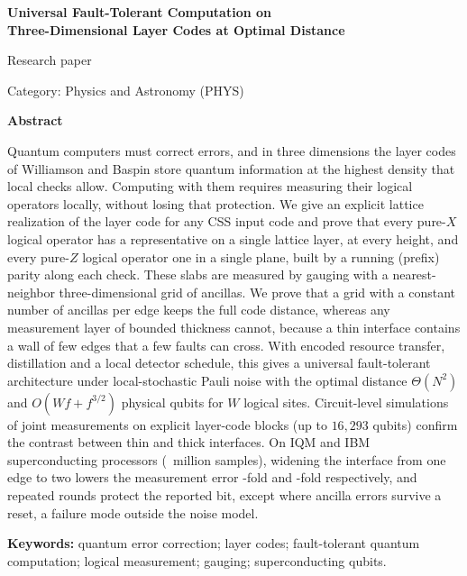 \documentclass[10pt,a4paper,twocolumn]{article}
\begin{document}
\begin{titlepage}
\centering
\vspace*{1.6cm}
{\LARGE\bfseries Universal Fault-Tolerant Computation on\\[4pt]
Three-Dimensional Layer Codes at Optimal Distance\par}
\vspace{1cm}
{\large Research paper\par}
\vspace{0.35cm}
{\normalsize Category: Physics and Astronomy (PHYS)\par}
\vspace{1.3cm}
\begin{minipage}{0.8\textwidth}
\centerline{\bfseries Abstract}
\smallskip
Quantum computers must correct errors, and in three dimensions the layer codes
of Williamson and Baspin store quantum information at the highest density that
local checks allow.  Computing with them requires measuring their logical
operators locally, without losing that protection.  We give an
explicit lattice realization of the layer code for any CSS input code and prove
that every pure-$X$ logical operator has a representative on a single lattice
layer, at every height, and every pure-$Z$ logical operator one in a single
plane, built by a running (prefix) parity along each check.  These slabs are
measured by gauging with a nearest-neighbor three-dimensional grid of ancillas.
We prove that a grid with a constant number of ancillas per edge keeps the full
code distance, whereas any measurement layer of bounded thickness cannot,
because a thin interface contains a wall of few edges that a few faults can
cross.  With encoded resource transfer, distillation and a local detector
schedule, this gives a universal fault-tolerant architecture under
local-stochastic Pauli noise with the optimal distance $\Theta(N^2)$ and
$O(Wf+f^{3/2})$ physical qubits for $W$ logical sites.  Circuit-level
simulations of joint measurements on explicit layer-code blocks (up to
$16{,}293$ qubits) confirm the contrast between thin and thick interfaces.  On
IQM and IBM superconducting processors (\hwTotalShots~million samples), widening
the interface from one edge to two lowers the measurement error
\hwIQMfold-fold and \hwIBMfoldOneTwo-fold respectively, and repeated rounds
protect the reported bit, except where ancilla errors survive a reset, a failure
mode outside the noise model.

\medskip
\noindent\textbf{Keywords:} quantum error correction; layer codes;
fault-tolerant quantum computation; logical measurement; gauging;
superconducting qubits.
\end{minipage}
\vfill
\end{titlepage}
\end{document}
